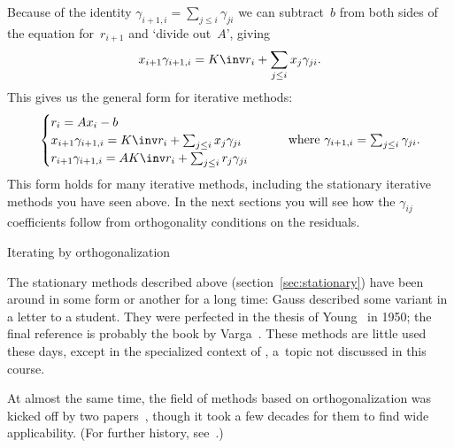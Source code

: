 Because of the identity $\gamma_{i+1,i}=\sum_{j\leq i}\gamma_{ji}$ we
can subtract~$b$ from both sides of the equation for~$r_{i+1}$ and
`divide out~$A$', giving
\[
  x_{i+1}\gamma_{i+1,i}=K\inv r_i+\sum_{j\leq i} x_j\gamma_{ji}.
\]
This gives us the general form for iterative methods:
\begin{equation}
  \begin{cases}
    r_i = Ax_i-b\\
    x_{i+1}\gamma_{i+1,i}=K\inv r_i+\sum_{j\leq i} x_j\gamma_{ji}\\
    r_{i+1}\gamma_{i+1,i}=AK\inv r_i+\sum_{j\leq i} r_j\gamma_{ji}
  \end{cases}\qquad
  \hbox{where $\gamma_{i+1,i}=\sum_{j\leq i}\gamma_{ji}$}.
  \label{eq:general-xr-hessenberg}
\end{equation}
This form holds for many iterative methods, including the stationary
iterative methods you have seen above. In the next sections you will
see how the $\gamma_{ij}$ coefficients follow from orthogonality
conditions on the residuals.

 {Iterating by orthogonalization}
\label{sec:fom}

The stationary methods described above (section~\ref{sec:stationary})
have been around in some form or another for a long time: Gauss
described some variant in a letter to a student. They were perfected
in the thesis of Young~\cite{Young:thesis} in 1950; the final
reference is probably the book by
Varga~\cite{Varga:iterative-analysis}. These methods are little used
these days, except in the specialized context of 
, a~topic not discussed in this course.

At almost the same time, the
field of methods based on orthogonalization was kicked off by two
papers~\cite{Lanczos1952:solution_of_systems,HestenesStiefel1952:cg},
though it took a few decades for them to find wide applicability. (For
further history, see~\cite{GolubOleary:cg-history}.)

